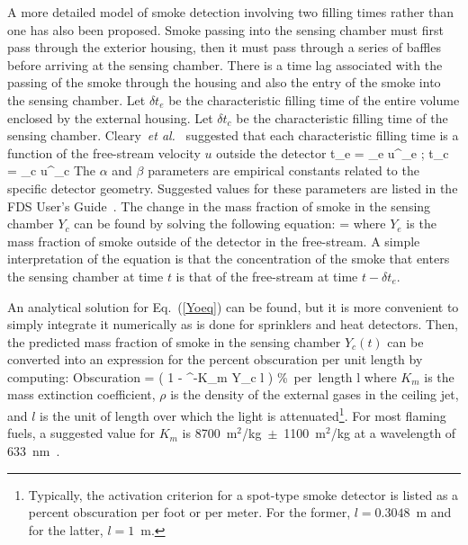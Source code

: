 A more detailed model of smoke detection involving two filling times rather than one has also been proposed.
Smoke passing into the sensing chamber must first pass through the exterior housing, then it must pass through a series
of baffles before arriving at the sensing chamber. There is a time lag
associated with the passing of the smoke through the housing and also the entry of the smoke into the sensing chamber.
Let $\delta t_e$ be the characteristic filling time of the entire volume enclosed by the external housing. Let
$\delta t_c$ be the characteristic filling time of the sensing chamber.
Cleary~{\em et al.}~\cite{Cleary:IAFSS6} suggested that each characteristic filling time is a function of the
free-stream velocity $u$ outside the detector
\be
\delta t_e = \alpha_e u^{\beta_e} \quad ; \quad \delta t_c = \alpha_c u^{\beta_c}
\ee
The $\alpha$ and $\beta$ parameters are empirical constants related to the specific detector geometry.
Suggested values for these parameters are listed in the FDS User's Guide~\cite{FDS_Users_Guide}.
The change in the mass fraction of smoke in the sensing chamber $Y_c$ can be found by solving the following equation:
\be
{} =  \label{Yoeq}
\ee
where $Y_e$ is the mass fraction of smoke outside of the detector in the free-stream.
A simple interpretation of the equation is that the concentration of the smoke that enters the sensing chamber at time $t$
is that of the free-stream at time $t-\delta t_e$.

An analytical solution for Eq.~(\ref{Yoeq}) can be found, but it is more convenient to simply integrate it numerically
as is done for sprinklers and heat detectors. Then, the predicted mass fraction of smoke in the sensing chamber
$Y_c(t)$ can be converted into an expression for the percent obscuration per unit length by computing:
\be
   \hbox{Obscuration}  = \left( 1 - ^{-K_m \rho Y_c l} \right)  \; \; \hbox{\% per length} \; l
\ee
where $K_m$ is the mass extinction coefficient, $\rho$ is the density of the external gases in the ceiling jet,
and $l$ is the unit of length over which the light is attenuated\footnote{Typically, the activation criterion for a spot-type smoke detector is listed as a percent obscuration per foot or per meter. For the former, $l=0.3048$~m and for the latter, $l=1$~m.}.
For most flaming fuels, a suggested value for $K_m$ is 8700~m$^2$/kg~$\pm$~1100~m$^2$/kg at a
wavelength of 633~nm~\cite{Mulholland:F+M}.

